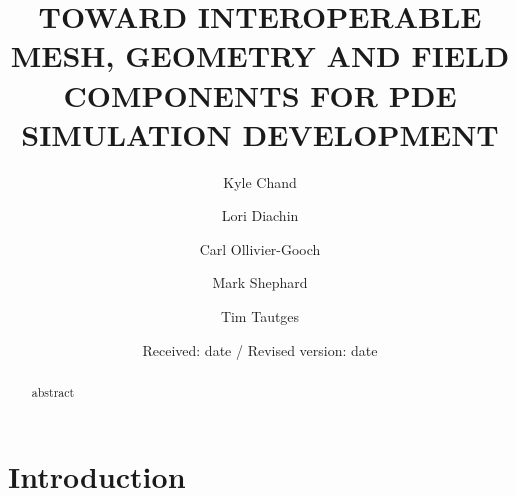 \documentclass[11pt]{article}
\begin{document}
\title{\uppercase{Toward Interoperable Mesh, Geometry and Field Components for PDE Simulation Development}}
\author{Kyle Chand \and Lori Diachin \and Carl Ollivier-Gooch \and Mark
  Shephard \and Tim Tautges}
\date{Received: date / Revised version: date}

\maketitle
\begin{abstract}
abstract
\end{abstract}

\section{Introduction}

\end{document}
